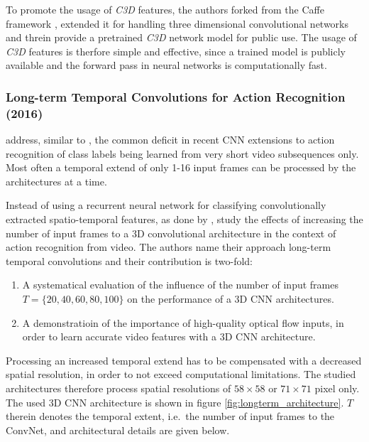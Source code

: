To promote the usage of \textit{C3D} features, the authors forked from the Caffe framework \cite{jia_caffe:_2014}, extended it for handling three dimensional convolutional networks and threin provide a pretrained \textit{C3D} network model for public use.
The usage of \textit{C3D} features is therfore simple and effective, since a trained model is publicly available and the forward pass in neural networks is computationally fast.


\subsubsection{Long-term Temporal Convolutions for Action Recognition (2016)}
\textcite{varol_long-term_2016} address, similar to \textcite{baccouche_sequential_2011}, the common deficit in recent CNN extensions to action recognition of class labels being learned from very short video subsequences only.
Most often a temporal extend of only 1-16 input frames can be processed by the architectures at a time. \cite{ji_3d_2013}\cite{karpathy_large-scale_2014}\cite{tran_learning_2015}

Instead of using a recurrent neural network for classifying convolutionally extracted spatio-temporal features, as done by \textcite{baccouche_sequential_2011}, \textcite{varol_long-term_2016} study the effects of increasing the number of input frames to a 3D convolutional architecture in the context of action recognition from video.
The authors name their approach long-term temporal convolutions and their contribution is two-fold:
\begin{enumerate}
    \item A systematical evaluation of the influence of the number of input frames $T = \{20, 40, 60, 80, 100\}$ on the performance of a 3D CNN architectures.  
    \item A demonstratioin of the importance of high-quality optical flow inputs, in order to learn accurate video features with a 3D CNN architecture.
\end{enumerate}

Processing an increased temporal extend has to be compensated with a decreased spatial resolution, in order to not exceed computational limitations.
The studied architectures therefore process spatial resolutions of $58\times58$ or $71\times71$ pixel only.
The used 3D CNN architecture is shown in figure \ref{fig:longterm_architecture}.
$T$ therein denotes the temporal extent, i.e.\ the number of input frames to the ConvNet, and architectural details are given below.

